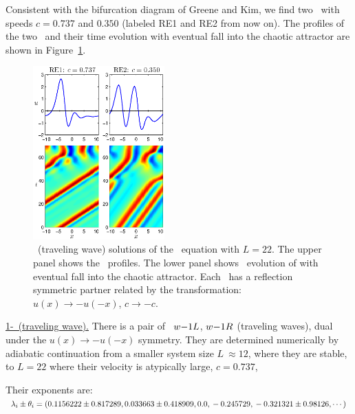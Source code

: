 Consistent with the bifurcation diagram of Greene and Kim,
we find two \reqva\ with speeds $c = 0.737$ and $0.350$
(labeled RE1 and RE2 from now on).
The profiles of the two \reqva\ and their time evolution
with eventual fall into the chaotic attractor are
shown in Figure~\ref{f:ks22RE}.

\begin{figure}[h]\vspace*{-5pt} \centering
\includegraphics[width=0.45\textwidth]{figs/ks22_RE1-2.eps}
\vspace*{-5pt}\caption{ {\small \Reqv\ (traveling wave)
solutions of the \KS\ equation with $L = 22.$ The upper panel shows
the \Reqva\ profiles. The lower panel shows \Reqva\ evolution
of \reqva with eventual fall into the chaotic attractor.
Each \reqv\ has a reflection symmetric partner related by the
transformation: $u(x) \to -u(-x)$, $c \to -c$.}}
\label{f:ks22RE}\vspace*{-5pt}
\end{figure}


\underline{1-\reqv\  (traveling wave).}
There is a pair of \reqva\
${w-}1L$,
${w-}1R$
(traveling waves), dual under the
$u(x) \to -u(-x)$ symmetry. They are
determined numerically by
adiabatic continuation from a smaller system size
$L~\approx 12$,
where they are stable, to $L=22$
where their velocity is atypically large, $c=0.737$,

Their exponents are:
\\
$\lambda_i \pm \theta_i =
(
\\
  0.1156222 \pm 0.817289,   \\
  0.033663 \pm 0.418909,    \\
 0.0                    ,   \\
 -0.245729                    , \\
 -0.321321 \pm 0.98126,
\cdots
)$

